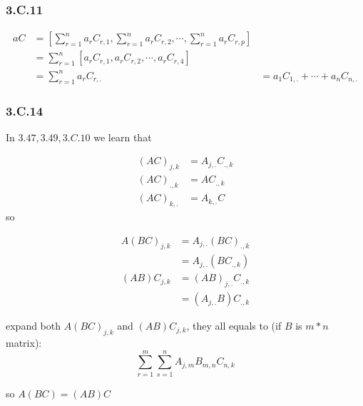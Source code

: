 \subsubsection*{3.C.11}

\begin{equation*}
    \begin{split}
aC &= [\sum_{r=1}^{n}a_{r}C_{r,1}, \sum_{r=1}^{n}a_{r}C_{r,2},\cdots, \sum_{r=1}^{n}a_{r}C_{r,p}] \\
&= \sum_{r=1}^{n}[a_{r}C_{r,1}, a_{r}C_{r,2}, \cdots, a_{r}C_{r,4}] \\
&= \sum_{r=1}^{n}a_{r}C_{r,.}
&= a_{1}C_{1,.} +\cdots + a_{n}C_{n,.}
\end{split}
\end{equation*}

\subsubsection*{3.C.14}

In $3.47,3.49, 3.C.10$ we learn that

\begin{equation*}
    \begin{split}
(AC)_{j,k} &= A_{j,.}C_{.,k} \\

(AC)_{.,k} &= AC_{.,k} \\
(AC)_{k,.} &= A_{k,.}C
\end{split}
\end{equation*}
so 

\begin{equation*}
    \begin{split}
    A(BC)_{j,k} &= A_{j,.}(BC)_{.,k} \\
    & = A_{j,.}(BC_{.,k}) \\
    (AB)C_{j,k} &= (AB)_{j,.}C_{.,k} \\
     &= (A_{j,.}B)C_{.,k}
\end{split}
\end{equation*}

expand both $A(BC)_{j,k}$ and $(AB)C_{j,k}$, they all equals to (if $B$ is $m*n$ matrix):
\[\sum_{r=1}^{m}\sum_{s=1}^{n}A_{j,m}B_{m,n}C_{n,k}\]

so $A(BC) = (AB)C$

\newpage